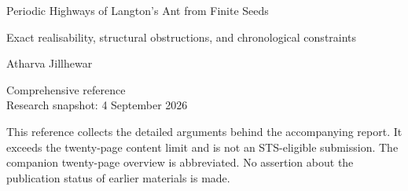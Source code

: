 \documentclass[11pt,letterpaper]{article}
\theoremstyle{plain}
\theoremstyle{definition}
\begin{document}
\begin{titlepage}
\centering
\vspace*{1in}
{\LARGE Periodic Highways of Langton's Ant from Finite Seeds\par}
\vspace{0.4in}
{\Large Exact realisability, structural obstructions, and chronological constraints\par}
\vspace{0.45in}
{\large Atharva Jillhewar\par}
\vfill
Comprehensive reference\\
Research snapshot: 4 September 2026
\par\medskip
\begin{minipage}{0.88\textwidth}
This reference collects the detailed arguments behind the accompanying report. It exceeds the twenty-page content limit and is not an
STS-eligible submission. The companion twenty-page overview is abbreviated.
No assertion about the publication status of earlier materials is made.
\end{minipage}
\end{titlepage}
\thispagestyle{empty}
\end{document}
